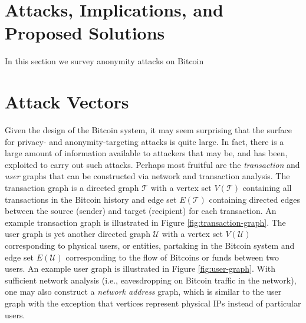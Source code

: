 \section{Attacks, Implications, and Proposed Solutions}
In this section we survey anonymity attacks on Bitcoin 


\section{Attack Vectors} \label{sec:vectors}
Given the design of the Bitcoin system, it may seem surprising that the surface for privacy- and anonymity-targeting attacks is quite large. In fact, there is a large amount of information available to attackers that may be, and has been, exploited to carry out such attacks. Perhaps most fruitful are the \emph{transaction} and \emph{user} graphs that can be constructed via network and transaction analysis. The transaction graph is a directed graph $\mathcal{T}$ with a vertex set $V(\mathcal{T})$ containing all transactions in the Bitcoin history and edge set $E(\mathcal{T})$ containing directed edges between the source (sender) and target (recipient) for each transaction. An example transaction graph is illustrated in Figure \ref{fig:transaction-graph}. The user graph is yet another directed graph $\mathcal{U}$ with a vertex set $V(\mathcal{U})$ corresponding to physical users, or entities, partaking in the Bitcoin system and edge set $E(\mathcal{U})$ corresponding to the flow of Bitcoins or funds between two users. An example user graph is illustrated in Figure \ref{fig:user-graph}. With sufficient network analysis (i.e., eavesdropping on Bitcoin traffic in the network), one may also construct a \emph{network address} graph, which is similar to the user graph with the exception that vertices represent physical IPs instead of particular users. 


